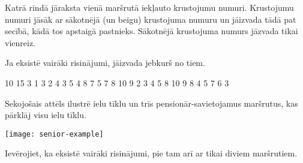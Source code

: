 \documentclass{boi2014-lv}
\begin{document}
		 Katrā rindā jāraksta vienā maršrutā iekļauto krustojumu numuri. Krustojumu numuri jāsāk ar sākotnējā (un beigu) krustojuma numuru un jāizvada tādā pat secībā, kādā tos apstaigā pastnieks. Sākotnējā krustojuma numurs jāzvada tikai vienreiz.

		Ja eksistē vairāki risinājumi, jāizvada jebkurš no tiem.

    \Example

    \example
    {
        10 15  3  1 3  2 4  3 5  4 8  7  5 7  8  10  9
    }
    {
        2 3 4 5 8 10 9  8 4  5 7 6 3
    }
    {
        Sekojošais attēls ilustrē ielu tīklu un trīs pensionār-savietojamus maršrutus, kas pārklāj visu ielu tīklu.

        \texttt{[image: senior-example]}

				Ievērojiet, ka eksistē vairāki risinājumi, pie tam arī ar tikai diviem maršrutiem.
    
    }
\end{document}
